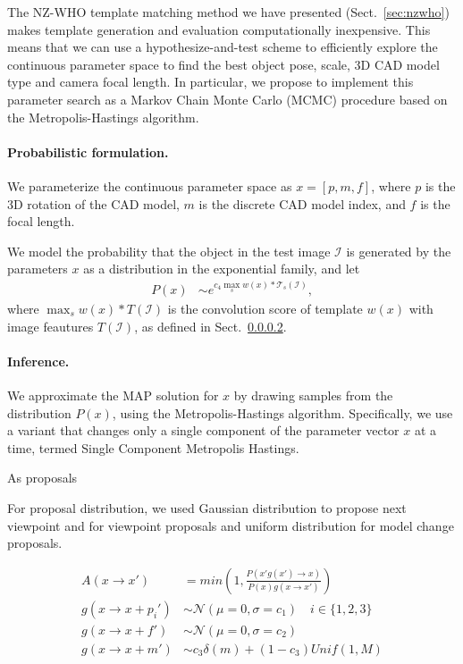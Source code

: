 The NZ-WHO template matching method we have presented
(Sect.~\ref{sec:nzwho}) makes template generation and evaluation
computationally inexpensive. This means that we can use a
hypothesize-and-test scheme to efficiently explore the continuous
parameter space to find the best object pose, scale, 3D CAD model type
and camera focal length.
%
In particular, we propose to implement this parameter search as a
Markov Chain Monte Carlo (MCMC) procedure based on the
Metropolis-Hastings algorithm.

\paragraph{Probabilistic formulation.}
We parameterize the continuous parameter space as  $x = [p, m, f]$,
where $p$ is the 3D rotation of the CAD model, $m$ is the discrete CAD
model index, and $f$ is the focal length.

We model the probability that the object in the test image
$\mathcal{I}$ is generated by the parameters $x$ as a distribution in
the exponential family, and let
\begin{align}
    P(x) & \sim e^{ c_4 \max_{s} w(x) \ast \mathcal{T}_s(\mathcal{I})},
\end{align}
where $\max_{s} w(x) \ast T(\mathcal{I})$ is the convolution score of
template $w(x)$ with image feautures $T(\mathcal{I})$, as defined
in Sect.~\ref{}.

\paragraph{Inference.}
We approximate the MAP solution for $x$ by drawing samples from the
distribution $P(x)$, using the Metropolis-Hastings
algorithm. Specifically, we use a variant that changes only a single
component of the parameter vector $x$ at a time, termed Single
Component Metropolis Hastings.

As proposals

For proposal distribution, we used Gaussian distribution to propose next viewpoint and for viewpoint proposals
and uniform distribution for model change proposals.  


\begin{align}
    A(x \rightarrow x') & =  min\left( 1,  \frac{P(x' g(x') \rightarrow x)}{P(x) g(x \rightarrow x')}\right) \\
    g(x \rightarrow x + p_i') & \sim \mathcal{N}(\mu = 0,\sigma = c_1) \quad i \in \{1,2,3\}\\
    g(x \rightarrow x + f') & \sim \mathcal{N}(\mu = 0,\sigma = c_2)\\
    g(x \rightarrow x + m') & \sim c_3 \delta(m) + (1-c_3) Unif(1,M)
\end{align}


